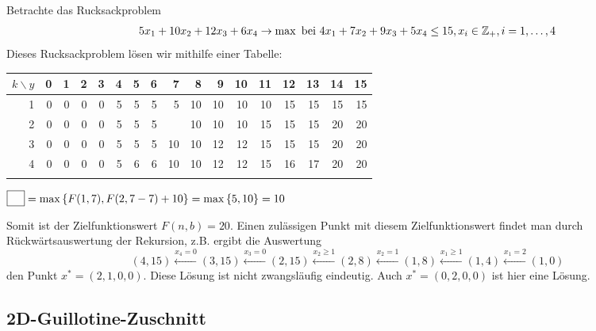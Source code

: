 \begin{beispiel}
	Betrachte das Rucksackproblem
	\begin{equation*}
		5x_1 + 10x_2 + 12x_3 + 6x_4 \to \max \text{ bei } 4x_1 + 7x_2 + 9x_3 + 5x_4 \le 15, x_i \in \mathbb{Z}_+, i=1, \dots, 4
	\end{equation*}
	Dieses Rucksackproblem lösen wir mithilfe einer Tabelle:
	\begin{center}
		\begin{tabular}{r|rrrrrrrrrrrrrrrr}
			$k \backslash y$ & 0     & 1     & 2     & 3     & 4     & 5     & 6     & 7     & 8     & 9     & 10    & 11    & 12    & 13    & 14    & 15 \\ \hline
			1     & 0     & 0     & 0     & 0     & 5     & 5     & 5     & 5     & 10    & 10    & 10    & 10    & 15    & 15    & 15    & 15 \\
			2     & 0     & 0     & 0     & 0     & 5     & 5     & 5     & \fbox{10}    & 10    & 10    & 10    & 15    & 15    & 15    & 20    & 20 \\
			3     & 0     & 0     & 0     & 0     & 5     & 5     & 5     & 10    & 10    & 12    & 12    & 15    & 15    & 15    & 20    & 20 \\
			4     & 0     & 0     & 0     & 0     & 5     & 6     & 6     & 10    & 10    & 12    & 12    & 15    & 16    & 17    & 20    & 20 \\
			&       &       &       &       &       &       &       &       &       &       &       &       &       &       &       &
		\end{tabular}
	\end{center}
	$\fbox{\phantom{M}}= \max\left\{ F(1,7), F(2,7-7) + 10 \right\} = \max\left\{ 5,10 \right\} = 10$

	Somit ist der Zielfunktionswert $F(n,b) = 20$.
	Einen zulässigen Punkt mit diesem Zielfunktionswert findet man durch Rückwärtsauswertung der Rekursion, z.B. ergibt die Auswertung
	\begin{equation*}
	(4,15) \overset{x_4 = 0}{\longleftarrow} (3,15) \overset{x_3 = 0}{\longleftarrow} (2,15) \overset{x_2 \ge 1}{\longleftarrow} (2,8) \overset{x_2 = 1}{\longleftarrow} (1,8) \overset{x_1 \ge 1}{\longleftarrow} (1,4) \overset{x_1 = 2}{\longleftarrow} (1,0)
	\end{equation*}
	den Punkt $x^\ast = (2,1,0,0)$.
	Diese Lösung ist nicht zwangsläufig eindeutig. Auch $x^\ast = (0,2,0,0)$ ist hier eine Lösung.
\end{beispiel}

\subsection{2D-Guillotine-Zuschnitt}

